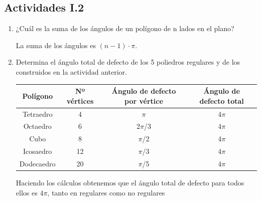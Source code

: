 \subsection{Actividades I.2}
\begin{enumerate}
	\item ¿Cuál es la suma de los ángulos de un polígono de n lados en el plano?
	
	La suma de los ángulos es $(n-1)\cdot \pi$.
	
	\item Determina el ángulo total de defecto de los 5 poliedros regulares y de los construidos en la actividad anterior.
	
	
	\begin{table}[H]
		\centering
		\begin{tabular}{@{}cccc@{}}
			\toprule
			\textbf{Polígono} & \textbf{Nº vértices} & \textbf{Ángulo de defecto por vértice} & \textbf{Ángulo de defecto total} \\ \midrule
			Tetraedro         & 4                    & $\pi$                                      & 4$\pi$                           \\
			Octaedro          & 6                    & 2$\pi$/3                                   & 4$\pi$                           \\
			Cubo              & 8                    & $\pi$/2                                    & 4$\pi$                           \\
			Icosaedro         & 12                   & $\pi$/3                                    & 4$\pi$                           \\
			Dodecaedro        & 20                   & $\pi$/5                                    & 4$\pi$                           \\ \bottomrule
		\end{tabular}
	\end{table}
	
	Haciendo los cálculos obtenemos que el ángulo total de defecto para todos ellos es $4\pi$, tanto en regulares como no regulares
	
\end{enumerate}

